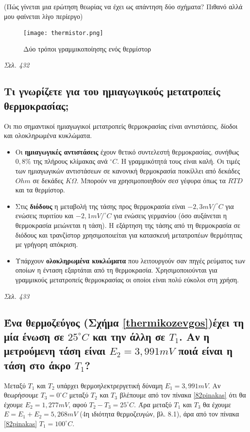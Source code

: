 \documentclass{article}
\begin{document}
(Πώς γίνεται μια ερώτηση θεωρίας να έχει ως απάντηση δύο σχήματα? Πιθανό αλλά μου φαίνεται λίγο περίεργο)

\begin{figure}[h!]
    \texttt{[image: thermistor.png]}
    \caption{Δύο τρόποι γραμμικοποίησης ενός θερμίστορ}
    \label{thermistor}
\end{figure}

\emph{Σελ. 432}

\subsection{Τι γνωρίζετε για του ημιαγωγικούς μετατροπείς θερμοκρασίας;}
Οι πιο σημαντικοί ημιαγωγικοί μετατροπείς θερμοκρασίας είναι αντιστάσεις, δίοδοι και ολοκληρωμένα κυκλώματα.

\begin{itemize}
    \item Οι \textbf{ημιαγωγικές αντιστάσεις} έχουν θετικό συντελεστή θερμοκρασίας, συνήθως $0,8\%$ της πλήρους κλίμακας ανά $^{\circ}C$. Η γραμμικότητά τους είναι καλή.
        Οι τιμές των ημιαγωγικών αντιστάσεων σε κανονική θερμοκρασία ποικίλλει από δεκάδες $Ohm$ σε δεκάδες $K\Omega$. Μπορούν να χρησιμοποιηθούν σεσ γέφυρα όπως τα
        $RTD$ και τα θερμίστορ.
    \item Στις \textbf{διόδους} η μεταβολή της τάσης προς θερμοκρασία είναι $-2,3mV/^{\circ}C$ για ενώσεις πυριτίου και $-2,1mV/^{\circ}C$ για ενώσεις γερμανίου (όσο 
        αυξάνεται η θερμοκρασία μειώνεται η τάση). Η εξάρτηση της τάσης από τη θερμοκρασία σε διόδους και τρανζίστορ χρησιμοποιείται για κατασκευή μετατροπέων θερμότητας
        με γρήγορη απόκριση.
    \item Υπάρχουν \textbf{ολοκληρωμένα κυκλώματα} που λειτουργούν σαν πηγές ρεύματος των οποίων η ένταση εξαρτάται από τη θερμοκρασία. Χρησιμοποιούνται για γραμμικούς
        μετατροπείς θερμοκρασίας οι οποίοι είναι πολύ εύκολοι στη χρήση.
\end{itemize}

\emph{Σελ. 433}

\subsection{Ένα θερμοζεύγος (Σχήμα \ref{thermikozevgos})έχει τη μία ένωση σε $25^{\circ} C$ και την άλλη σε $Τ_1$. Αν η μετρούμενη τάση είναι $E_2=3,991mV$ 
ποιά είναι η τάση στο άκρο $T_1$?}
Μεταξύ $Τ_1$ και $Τ_2$ υπάρχει θερμοηλεκτρεργετική δύναμη $Ε_1 = 3,991 mV$. Αν θεωρήσουμε $T_3 = 0^{\circ}C$ μεταξύ $T_2$ και $T_3$ βλέπουμε από τον πίνακα 
\ref{82pinakas} ότι θα έχουμε $E_2 = 1,277mV$, αφού $T_2 - T_3 = 25^{\circ}C$. Άρα μεταξύ $T_1$ και $T_3$ θα έχουμε $E = E_1 + E_2 = 5,268mV$ (4η ιδιότητα 
θερμοζευγών, βλ. 8.1), άρα από τον πίνακα \ref{82pinakas} $T_1 = 100^{\circ}C$.
\end{document}
